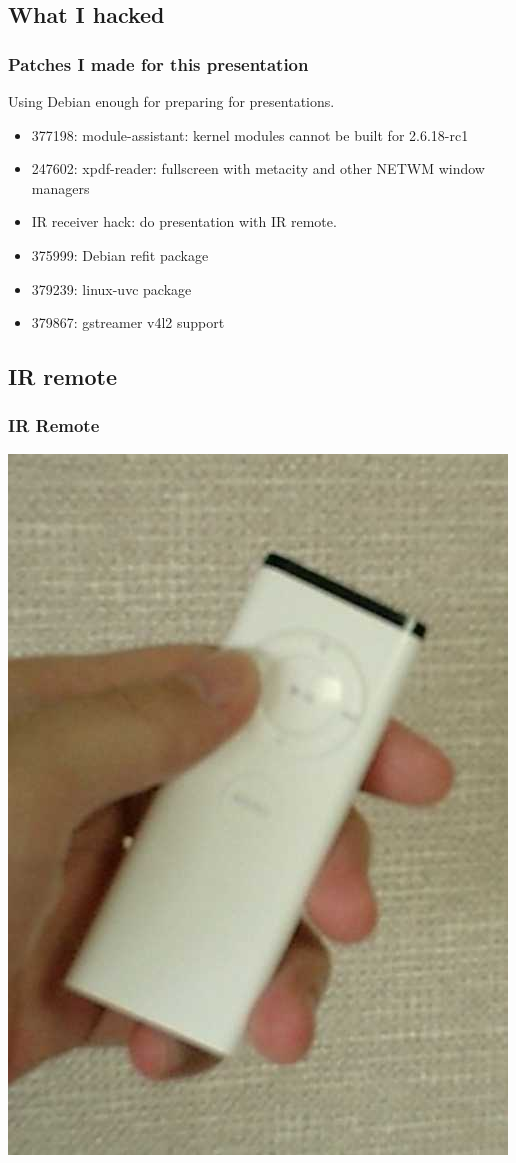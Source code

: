 \documentclass[cjk,dvipdfmx]{beamer}
\begin{document}
\subsection{What I hacked}

\begin{frame}
 \frametitle{Patches I made for this presentation}

Using Debian enough for preparing for presentations.

 \begin{itemize}[<+->]
  \item 377198: module-assistant: kernel modules cannot be built for 2.6.18-rc1
  \item 247602: xpdf-reader: fullscreen with metacity and other NETWM
	window managers
  \item IR receiver hack: do presentation with IR remote.
  \item 375999: Debian refit package
  \item 379239: linux-uvc package
  \item 379867: gstreamer v4l2 support
 \end{itemize}
\end{frame}

\subsection{IR remote}
\begin{frame}
 \frametitle{IR Remote}
\includegraphics[width=0.4\hsize]{image200607/remote.png}
\end{frame}
\end{document}
